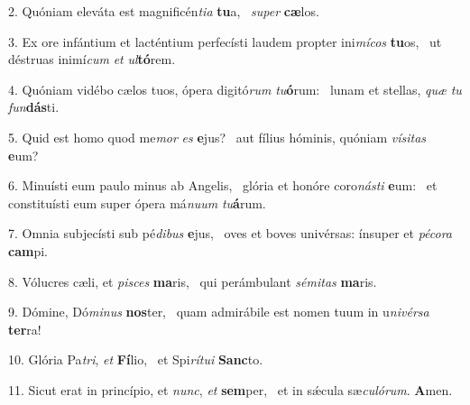 2. Quóniam eleváta est magnificén\textit{ti}\textit{a} \textbf{tu}a, \ast\  \textit{su}\textit{per} \textbf{cæ}los.\

3. Ex ore infántium et lacténtium perfecísti laudem propter ini\textit{mí}\textit{cos} \textbf{tu}os, \ast\  ut déstruas inimí\textit{cum} \textit{et} \textit{ul}\textbf{tó}rem.\

4. Quóniam vidébo cælos tuos, ópera digitó\textit{rum} \textit{tu}\textbf{ó}rum: \ast\  lunam et stellas, \textit{quæ} \textit{tu} \textit{fun}\textbf{dás}ti.\

5. Quid est homo quod me\textit{mor} \textit{es} \textbf{e}jus? \ast\  aut fílius hóminis, quóniam \textit{ví}\textit{si}\textit{tas} \textbf{e}um?\

6. Minuísti eum paulo minus ab Angelis, \dag\  glória et honóre coro\textit{nás}\textit{ti} \textbf{e}um: \ast\  et constituísti eum super ópera má\textit{nu}\textit{um} \textit{tu}\textbf{á}rum.\

7. Omnia subjecísti sub pé\textit{di}\textit{bus} \textbf{e}jus, \ast\  oves et boves univérsas: ínsuper et \textit{pé}\textit{co}\textit{ra} \textbf{cam}pi.\

8. Vólucres cæli, et \textit{pi}\textit{sces} \textbf{ma}ris, \ast\  qui perámbulant \textit{sé}\textit{mi}\textit{tas} \textbf{ma}ris.\

9. Dómine, Dó\textit{mi}\textit{nus} \textbf{nos}ter, \ast\  quam admirábile est nomen tuum in u\textit{ni}\textit{vér}\textit{sa} \textbf{ter}ra!\

10. Glória Pa\textit{tri}, \textit{et} \textbf{Fí}lio, \ast\  et Spi\textit{rí}\textit{tu}\textit{i} \textbf{Sanc}to.\

11. Sicut erat in princípio, et \textit{nunc}, \textit{et} \textbf{sem}per, \ast\  et in sǽcula sæ\textit{cu}\textit{ló}\textit{rum}. \textbf{A}men.\

